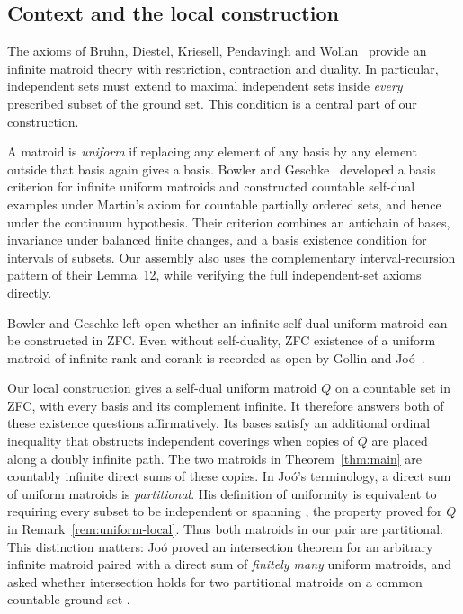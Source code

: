 \subsection*{Context and the local construction}

The axioms of Bruhn, Diestel, Kriesell, Pendavingh and
Wollan~\cite{BDKPW2013} provide an infinite matroid theory with restriction,
contraction and duality. In particular, independent sets must extend to
maximal independent sets inside \emph{every} prescribed subset of the
ground set. This condition is a central part of our construction.

A matroid is \emph{uniform} if replacing any element of any basis by any
element outside that basis again gives a basis. Bowler and
Geschke~\cite[Theorem~6 and the proof of Theorem~15]{BowlerGeschke2016} developed a basis criterion for infinite
uniform matroids and constructed countable self-dual examples under
Martin's axiom for countable partially ordered sets, and hence under the
continuum hypothesis. Their criterion combines an
antichain of bases, invariance under balanced finite changes, and a basis
existence condition for intervals of subsets. Our assembly also uses the
complementary interval-recursion pattern of their Lemma~12, while
verifying the full independent-set axioms directly.

Bowler and Geschke left open whether an infinite self-dual uniform matroid
can be constructed in ZFC. Even without self-duality, ZFC existence of a
uniform matroid of infinite rank and corank is recorded as open by Gollin
and Jo\'o~\cite[Section~1]{GollinJoo2025}.

Our local construction gives a self-dual uniform matroid $Q$ on a
countable set in ZFC, with every basis and its complement infinite.
It therefore answers both of these existence questions affirmatively.
Its bases satisfy an additional ordinal inequality that obstructs
independent coverings when copies of $Q$ are placed along a doubly
infinite path. The two matroids in Theorem~\ref{thm:main} are countably
infinite direct sums of these copies. In Jo\'o's terminology, a direct sum
of uniform matroids is \emph{partitional}. His definition of uniformity is
equivalent to requiring every subset to be independent or spanning
\cite[Definition~1.2 and Proposition~2.2]{Joo2021Partitional}, the property
proved for $Q$ in Remark~\ref{rem:uniform-local}. Thus both matroids in our
pair are partitional. This distinction matters: Jo\'o proved an intersection
theorem for an arbitrary infinite matroid paired with a direct sum of
\emph{finitely many} uniform matroids, and asked whether intersection holds
for two partitional matroids on a common countable ground set
\cite[Theorem~1.4 and Question~1.5]{Joo2021Partitional}.

